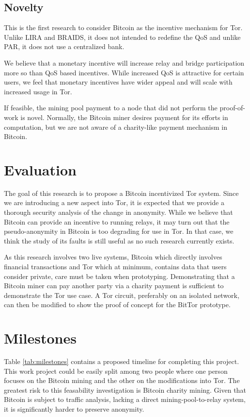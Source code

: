 \documentclass[letterpaper]{article}
\begin{document}
\subsection{Novelty}\label{sec:novelty}
This is the first research to consider Bitcoin as the incentive
mechanism for Tor.  Unlike LIRA and BRAIDS, it does not intended to
redefine the QoS and unlike PAR, it does not use a centralized bank.

We believe that a monetary incentive will increase relay and bridge
participation more so than QoS based incentives.  While increased QoS
is attractive for certain users, we feel that monetary incentives
have wider appeal and will scale with increased usage in Tor.

If feasible, the mining pool payment to a node that did not perform
the proof-of-work is novel.  Normally, the Bitcoin miner desires
payment for its efforts in computation, but we are not aware of a
charity-like payment mechanism in Bitcoin.


\section*{Evaluation}\label{sec:evaluation}

The goal of this research is to propose a Bitcoin incentivized Tor
system.  Since we are introducing a new aspect into Tor, it is
expected that we provide a thorough security analysis of the change in
anonymity.  While we believe that Bitcoin can provide an incentive to
running relays, it may turn out that the pseudo-anonymity in Bitcoin
is too degrading for use in Tor.  In that case, we think the study of
its faults is still useful as no such research currently exists.

As this research involves two live systems, Bitcoin which directly
involves financial transactions and Tor which at minimum, contains data
that users consider private, care must be taken when prototyping.
Demonstrating that a Bitcoin miner can pay another party via a charity
payment is sufficient to demonstrate the Tor use case.  A Tor circuit,
preferably on an isolated network, can then be modified to show the
proof of concept for the BitTor prototype.


\section*{Milestones}\label{sec:milestones}

Table \ref{tab:milestones} contains a proposed timeline for completing
this project.  This work project could be easily split among two
people where one person focuses on the Bitcoin mining and the other on
the modifications into Tor.  The greatest risk to this feasability
investigation is Bitcoin charity mining.  Given that Bitcoin is
subject to traffic analysis, lacking a direct mining-pool-to-relay
system, it is significantly harder to preserve anonymity.
\end{document}
